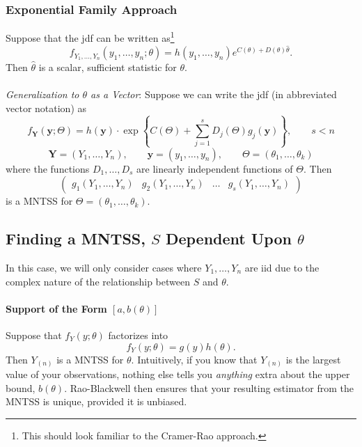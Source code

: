 \documentclass[a4paper,12pt]{scrartcl}
\begin{document}
\subsubsection{Exponential Family Approach}

Suppose that the jdf can be written as\footnote{This should look
familiar to the Cramer-Rao approach.}
   \[ f_{Y_1, \ldots, Y_n}(y_1, \ldots, y_n; \theta)=h(y_1, \ldots, y_n)
      e^{C(\theta) + D(\theta) \hat{\theta}}.\]
Then $\hat{\theta}$ is a scalar, sufficient statistic for $\theta$.
\\
\\
{\sl Generalization to $\theta$ as a Vector}: Suppose we can write the
jdf (in abbreviated vector notation) as
\[ f_{\mathbf{Y}}(\mathbf{y}; \Theta)
      = h(\mathbf{y})\cdot
      \exp\left\{ {C(\Theta) + \sum^s_{j=1} 
      D_j(\Theta) g_j(\mathbf{y}) }\right\}, \qquad s < n
	 \]
\[ \mathbf{Y} = (Y_1, \ldots, Y_n), \qquad 
   \mathbf{y} = (y_1, \ldots, y_n),
   \qquad \Theta = (\theta_1, \ldots, \theta_k) \]
where the functions $D_1, \ldots, D_s$ are linearly independent functions
of $\Theta$. Then 
\[ \begin{pmatrix} g_1(Y_1, \ldots, Y_n) & g_2(Y_1, \ldots, Y_n) & \ldots
      & g_s(Y_1, \ldots, Y_n) \end{pmatrix} \]
is a MNTSS for $\Theta = (\theta_1, \ldots, \theta_k)$.


\newpage
\subsection{Finding a MNTSS, $S$ Dependent Upon $\theta$}

In this case, we will only consider cases where $Y_1, \ldots, Y_n$
are iid due to the complex nature of the relationship between 
$S$ and $\theta$.


\paragraph{Support of the Form $[a, b(\theta)]$}
Suppose that $f_Y(y; \theta)$ factorizes into 
   \[ f_Y(y; \theta) = g(y) h(\theta).\]
Then $Y_{(n)}$ is a MNTSS for $\theta$. Intuitively, if you know
that $Y_{(n)}$ is the largest value of your observations, nothing
else tells you \emph{anything} extra about the upper bound, $b(\theta)$.
Rao-Blackwell then ensures that your resulting estimator from the
MNTSS is unique, provided it is unbiased.
\end{document}
